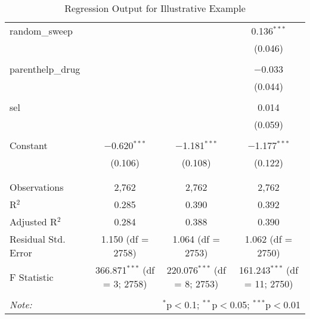 \documentclass[12pt]{article}
\begin{document}
\begin{table}[!htbp]
\begin{adjustbox}{width=1\textwidth}
\begin{tabular}{@{\extracolsep{5pt}}lccc}
 random\_sweep &  &  & 0.136$^{***}$ \\ 
  &  &  & (0.046) \\ 
  & & & \\ 
 parenthelp\_drug &  &  & $-$0.033 \\ 
  &  &  & (0.044) \\ 
  & & & \\ 
 sel &  &  & 0.014 \\ 
  &  &  & (0.059) \\ 
  & & & \\ 
 Constant & $-$0.620$^{***}$ & $-$1.181$^{***}$ & $-$1.177$^{***}$ \\ 
  & (0.106) & (0.108) & (0.122) \\ 
  & & & \\ 
\hline \\[-1.8ex] 
Observations & 2,762 & 2,762 & 2,762 \\ 
R$^{2}$ & 0.285 & 0.390 & 0.392 \\ 
Adjusted R$^{2}$ & 0.284 & 0.388 & 0.390 \\ 
Residual Std. Error & 1.150 (df = 2758) & 1.064 (df = 2753) & 1.062 (df = 2750) \\ 
F Statistic & 366.871$^{***}$ (df = 3; 2758) & 220.076$^{***}$ (df = 8; 2753) & 161.243$^{***}$ (df = 11; 2750) \\ 
\hline 
\hline \\[-1.8ex] 
\textit{Note:}  & \multicolumn{3}{r}{$^{*}$p$<$0.1; $^{**}$p$<$0.05; $^{***}$p$<$0.01} \\ 
\end{tabular} 
\end{adjustbox}
\caption{Regression Output for Illustrative Example}
\end{table} 
\end{document}
